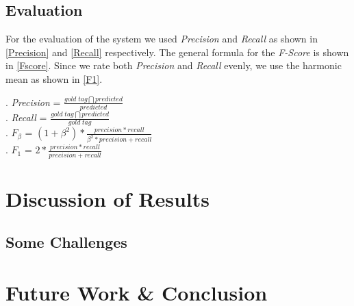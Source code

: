 \documentclass[11pt]{article}
\begin{document}
\subsection*{Evaluation}
For the evaluation of the system we used \emph{Precision} and \emph{Recall} as shown in \ref{Precision} and \ref{Recall} respectively.
The general formula for the \emph{F-Score} is shown in \ref{Fscore}. Since we rate both \emph{Precision} and \emph{Recall} evenly, we 
use the harmonic mean as shown in \ref{F1}.

\ex. \emph{Precision} = $ \frac{gold\; tag \bigcap predicted}{predicted}$ \label{Precision}\\


\ex. \emph{Recall} = $ \frac{gold \;tag \bigcap predicted}{gold\; tag}$ \label{Recall}\\


\ex. $F_{\beta}$ = $ (1+\beta^2)*\frac{precision *recall}{\beta^2* precision + recall}$ \label{Fscore}\\

\ex. $F_1$ = $ 2*\frac{precision *recall}{precision + recall}$ \label{F1}\\

\section{Discussion of Results}

\subsection*{Some Challenges} %


\section{Future Work \& Conclusion}






\end{document}
